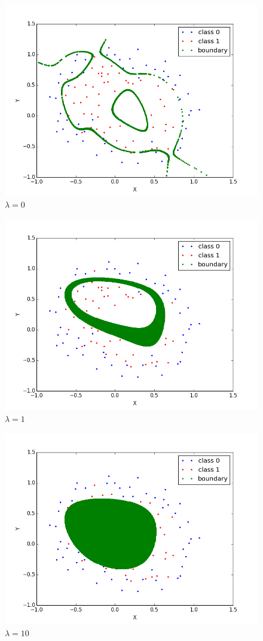 \documentclass{article}
\begin{document}
\begin{figure}[ht]
	\centering
	\includegraphics[scale=0.35]{lambda_0.png}
	\caption{$\lambda = 0$}
\end{figure}
\begin{figure}[ht]
	\centering
	\includegraphics[scale=0.35]{lambda_1.png}
	\caption{$\lambda = 1$}
\end{figure}
\begin{figure}[ht]
	\centering
	\includegraphics[scale=0.35]{lambda_10.png}
	\caption{$\lambda = 10$}
\end{figure}
\end{document}
